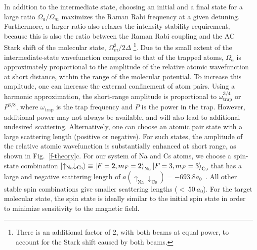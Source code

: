 \documentclass[aps,prl,twocolumn,10pt,superscriptaddress]{revtex4-1}
\newcommand{\Na}{\mathrm{Na}}
\newcommand{\Cs}{\mathrm{Cs}}
\begin{document}
In addition to the intermediate state,
choosing an initial and a final state for a large ratio $\Omega_a/\Omega_m$
maximizes the Raman Rabi frequency at a given detuning.
Furthermore, a larger ratio also relaxes the intensity stability requirement,
because this is also the ratio between the Raman Rabi coupling
and the AC Stark shift of the molecular state, $\Omega_m^2 / 2\Delta$
\footnote{There is an additional factor of 2, with both beams at equal power,
  to account for the Stark shift caused by both beams.}.
Due to the small extent of the intermediate-state wavefunction
compared to that of the trapped atoms,
$\Omega_a$ is approximately proportional to
the amplitude of the relative atomic wavefunction at short distance,
within the range of the molecular potential.
To increase this amplitude, one can increase the external confinement of atom pairs.
Using a harmonic approximation,
the short-range amplitude is proportional to $ \omega_{\text{trap}}^{3/4} $ or $P^{3/8}$,
where $ \omega_{\text{trap}} $ is the trap frequency and $P$ is the power in the trap\cite{Mies2000}. However, additional power may not always be available, and will also lead to additional undesired scattering.
Alternatively, one can choose an atomic pair state with a large scattering length
(positive or negative).
For such states, the amplitude of the relative atomic wavefunction is substantially enhanced
at short range, as shown in Fig.~\ref{f-theory}c.
For our system of Na and Cs atoms,
we choose a spin-state combination $\ket{\uparrow_{\Na} \downarrow_{\Cs}}\equiv \ket{F=2,m_F=2}_{\Na}\ket{F=3,m_F=3}_{\Cs}$ that has a large and negative scattering length of
$a(\uparrow_{\Na} \downarrow_{\Cs}) = -693.8a_0$~\cite{Hood2019}.
All other stable spin combinations give smaller scattering lengths ($<~50~a_0$).
For the target molecular state, the spin state is ideally similar to the initial spin state in order to minimize sensitivity to the magnetic field.
\end{document}
